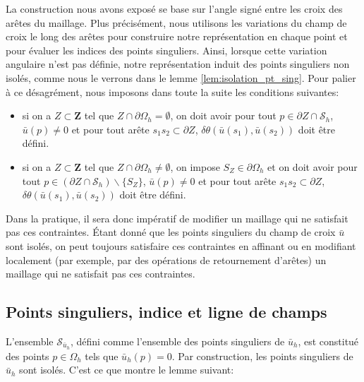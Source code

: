 \begin{remark}
La construction nous avons exposé se base sur l'angle signé entre les croix des arêtes du maillage. Plus précisément, nous utilisons les variations du champ de croix le long des arêtes pour construire notre représentation en chaque point et pour évaluer les indices des points singuliers. Ainsi, lorsque cette variation angulaire n'est pas définie, notre représentation induit des points singuliers non isolés, comme nous le verrons dans le lemme \ref{lem:isolation_pt_sing}.
Pour palier à ce désagrément, nous imposons dans toute la suite les conditions suivantes:\\
\begin{itemize}
 \item si on a $Z\subset\mathbf{Z}$ tel que $Z\cap\partial\Omega_h=\emptyset$, on doit avoir pour tout $p\in\partial Z\cap\mathcal{S}_h$, $\bar{u}(p)\neq 0$ et pour tout arête $s_1s_2\subset\partial Z$, $\delta\theta(\bar{u}(s_1),\bar{u}(s_2))$ doit être défini.\\
 \item si on a $Z\subset\mathbf{Z}$ tel que $Z\cap\partial\Omega_h\neq\emptyset$, on impose $S_Z\in\partial\Omega_h$ et on doit avoir pour tout $p\in(\partial Z\cap\mathcal{S}_h)\backslash\{S_Z\}$, $\bar{u}(p)\neq 0$ et pour tout arête $s_1s_2\subset\partial Z$, $\delta\theta(\bar{u}(s_1),\bar{u}(s_2))$ doit être défini.\\
\end{itemize}
Dans la pratique, il sera donc impératif de modifier un maillage qui ne satisfait pas ces contraintes. %
Étant donné que les points singuliers du champ de croix $\bar{u}$ sont isolés, on peut toujours satisfaire ces contraintes en affinant ou en modifiant localement (par exemple, par des opérations de retournement d'arêtes) un maillage qui ne satisfait pas ces contraintes.
\end{remark}

\subsection{Points singuliers, indice et ligne de champs}
\label{subsec:pt_sing_ind_lign_champ}

L'ensemble $\mathcal{S}_{\bar{u}_h}$, défini comme l'ensemble des points singuliers de $\bar{u}_h$, est constitué des points $p \in \Omega_h$ tels que $\bar{u}_h(p) = 0$. Par construction, les points singuliers de $\bar{u}_h$ sont isolés. C'est ce que montre le lemme suivant:

